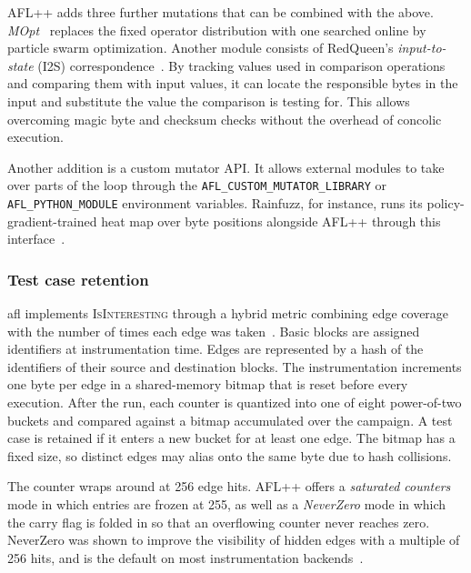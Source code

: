 AFL++ adds three further mutations that can be combined with the above.
\emph{MOpt}~\cite{lyu_mopt_nodate} replaces the fixed operator distribution with one
searched online by particle swarm optimization.
Another module consists of RedQueen's \emph{input-to-state} (I2S)
correspondence~\cite{aschermann_redqueen_2019}.
By tracking values used in comparison operations and comparing them with input values,
it can locate the responsible bytes in the input and substitute the value the comparison is testing for.
This allows overcoming magic byte and checksum checks without the overhead of concolic execution.

Another addition is a custom mutator API.
It allows external modules to take over parts of the loop through the \texttt{AFL\_CUSTOM\_MUTATOR\_LIBRARY} or \texttt{AFL\_PYTHON\_MODULE}
environment variables.
Rainfuzz, for instance, runs its policy-gradient-trained heat map over byte
positions alongside AFL++ through this interface~\cite{binosi_rainfuzz_2023}.

\subsubsection{Test case retention}

\gls{afl} implements \textsc{IsInteresting} through a hybrid metric combining edge coverage with
the number of times each edge was taken~\cite{fioraldi_afl_nodate}.
Basic blocks are assigned identifiers at instrumentation time.
Edges are represented by a hash of the identifiers of their source and destination blocks.
The instrumentation increments one byte per edge in a shared-memory bitmap that is reset before every execution.
After the run, each counter is quantized into one of eight power-of-two buckets and
compared against a bitmap accumulated over the campaign.
A test case is retained if it enters a new bucket for at least one edge.
The bitmap has a fixed size, so distinct edges may alias onto the same byte due to hash collisions.

The counter wraps around at 256 edge hits.
AFL++ offers a \emph{saturated counters} mode in which entries are frozen at 255,
as well as a \emph{NeverZero} mode in which the carry flag is folded in so that
an overflowing counter never reaches zero.
NeverZero was shown to improve the visibility of hidden edges with a multiple of
256 hits, and is the default on most instrumentation backends~\cite{fioraldi_afl_nodate}.

